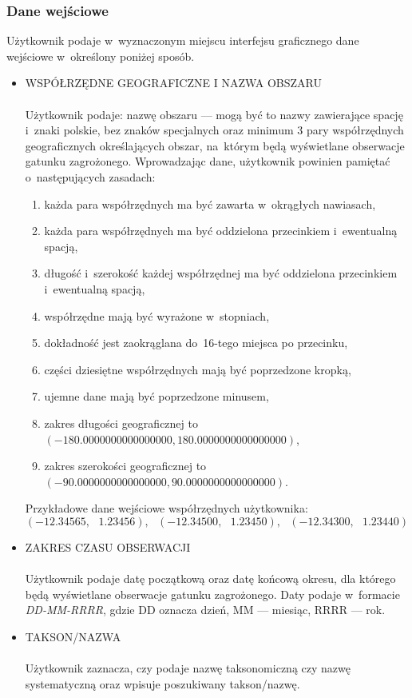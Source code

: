 \documentclass{article}
\begin{document}
 \subsubsection{Dane wejściowe}
 Użytkownik podaje w~wyznaczonym miejscu interfejsu graficznego dane wejściowe w~określony poniżej sposób.
 \begin{itemize}
     \item WSPÓŁRZĘDNE GEOGRAFICZNE I NAZWA OBSZARU\\\\ Użytkownik podaje: nazwę obszaru --- mogą być to nazwy zawierające spację i~znaki polskie, bez znaków specjalnych oraz minimum 3 pary współrzędnych geograficznych określających obszar, na~którym będą wyświetlane obserwacje gatunku zagrożonego. Wprowadzając dane, użytkownik powinien pamiętać o~następujących zasadach:
 \begin{enumerate}
     \item każda para współrzędnych ma być zawarta w~okrągłych nawiasach,
     \item każda para współrzędnych ma być oddzielona przecinkiem i~ewentualną spacją,
     \item długość i~szerokość każdej współrzędnej ma być oddzielona przecinkiem i~ewentualną spacją, 
     \item współrzędne mają być wyrażone w~stopniach,
     \item dokładność jest zaokrąglana do~16-tego miejsca po przecinku,
     \item części dziesiętne współrzędnych mają być poprzedzone kropką,
     \item ujemne dane mają być poprzedzone minusem,
     \item zakres długości geograficznej to $(-180.0000000000000000, 180.0000000000000000)$, 
     \item zakres szerokości geograficznej to $(-90.0000000000000000, 90.0000000000000000)$.

 \end{enumerate} Przykładowe dane wejściowe współrzędnych użytkownika: 
 $$(-12.34565,\textit{ } 1.23456),\textit{ }(-12.34500,\textit{ } 1.23450),\textit{ } (-12.34300,\textit{ } 1.23440)$$
 \item ZAKRES CZASU OBSERWACJI\\\\ Użytkownik podaje datę początkową oraz datę końcową okresu, dla którego będą wyświetlane obserwacje gatunku zagrożonego. Daty podaje w~formacie \textit{DD-MM-RRRR}, gdzie DD oznacza dzień, MM --- miesiąc, RRRR --- rok.
 
 \item TAKSON/NAZWA\\\\Użytkownik zaznacza, czy podaje nazwę taksonomiczną czy nazwę systematyczną oraz wpisuje poszukiwany takson/nazwę.
 \end{itemize}
  
\end{document}
